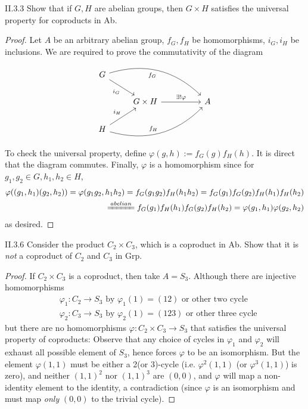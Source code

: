 \begin{problem}{II.3.3}
Show that if $G, H$ are abelian groups, then $G \times H$ satisfies the universal property for coproducts in \textsf{Ab}.
\end{problem}
\begin{proof} 
Let $A$ be an arbitrary abelian group, $f_G, f_H$ be homomorphisms, $i_G, i_H$ be inclusions. We are required to prove the commutativity of the diagram
\[
\begin{tikzcd}
G \arrow[rrrd, "f_G"', bend left] \arrow[rd, "i_G"'] &                                          &  &   \\
& G \times H \arrow[rr, "\exists!\varphi"] &  & A \\
H \arrow[rrru, "f_H", bend right] \arrow[ru, "i_H"]  &                                          &  &  
\end{tikzcd}
\]
To check the universal property, define $\varphi(g,h) := f_G(g)f_H(h)$. It is direct that the diagram commutes. Finally, $\varphi$ is a homomorphism since for $g_1,g_2 \in G, h_1,h_2 \in H$,
\[
\begin{split}
\varphi((g_1,h_1)(g_2,h_2)) = \varphi(g_1g_2,h_1h_2) = f_G(g_1g_2)f_H(h_1h_2) = f_G(g_1)f_G(g_2)f_H(h_1)f_H(h_2) \\ 
\xlongequal{abelian} f_G(g_1)f_H(h_1)f_G(g_2)f_H(h_2) = \varphi(g_1,h_1)\varphi(g_2,h_2)
\end{split}
\]
as desired.
\end{proof}

\begin{problem}{II.3.6}
Consider the product $C_2 \times C_3$, which is a coproduct in \textsf{Ab}. Show that it is \textit{not} a coproduct of $C_2$ and $C_3$ in \textsf{Grp}.
\end{problem}
\begin{proof}
If $C_2 \times C_3$ is a coproduct, then take $A = S_3$. Although there are injective homomorphisms
\begin{align*}
&\varphi_1:C_2 \to S_3 \text{ by } \varphi_1(1) = (12) \text{ or other two cycle}\\
&\varphi_2:C_3 \to S_3 \text{ by } \varphi_2(1) = (123)\text{ or other three cycle} 
\end{align*}
but there are no homomorphisms $\varphi:C_2 \times C_3 \to S_3$ that satisfies the universal property of coproducts: Observe that any choice of cycles in $\varphi_1$ and $\varphi_2$ will exhaust all possible element of $S_3$, hence forces $\varphi$ to be an isomorphism. But the element $\varphi(1,1)$ must be either a 2(or 3)-cycle (i.e. $\varphi^2(1,1)$ (or $\varphi^3(1,1)$) is zero), and neither $(1,1)^2$ nor $(1,1)^3$ are $(0,0)$, and $\varphi$ will map a non-identity element to the identity, a contradiction (since $\varphi$ is an isomorphism and must map \emph{only} $(0,0)$ to the trivial cycle).
\end{proof}

